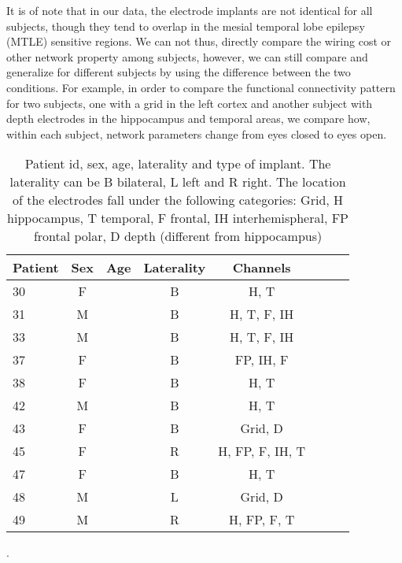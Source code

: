 \documentclass[11pt, onecolumn]{article}
\begin{document}
It is of note that in our data, the electrode implants are not identical for all subjects, though they tend to overlap in the mesial temporal lobe epilepsy (MTLE) sensitive regions. We can not thus, directly compare the wiring cost or other network property among subjects, however, we can still compare and generalize for different subjects by using the difference between the two conditions. For example, in order to compare the functional connectivity pattern for two subjects, one with a grid in the left cortex and another subject with depth electrodes in the hippocampus and temporal areas, we compare how, within each subject, network parameters change from eyes closed to eyes open.
\begin{table}
\centering
\begin{tabular}{l*{6}{c}r}
Patient & Sex & Age & Laterality & Channels  \\
\hline
30 & F &  & B & H, T \\
31 & M &  & B & H, T, F, IH \\
33 & M &  & B & H, T, F, IH \\
37 & F &  & B & FP, IH, F  \\
38 & F &  & B & H, T \\
42 & M &  & B & H, T  \\ %
43 & F &  & B & Grid, D \\%
45 & F &  & R & H, FP, F, IH, T   \\
47 & F &  & B & H, T  \\
48 & M &  & L & Grid, D \\ %
49 & M &  & R & H, FP, F, T   \\
\end{tabular}
\caption{\label{Table:demog} Patient id, sex, age, laterality and type of implant. 
The laterality can be B bilateral, L left and R right. The location of the electrodes fall under the following categories: Grid, H hippocampus, T temporal, F frontal, IH interhemispheral, FP frontal polar, D depth (different from hippocampus)}.
\end{table}
\end{document}
